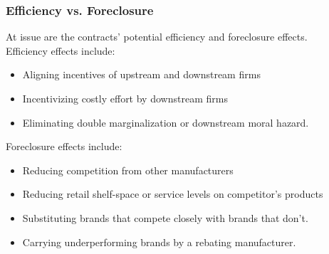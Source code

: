 \begin{frame}
\frametitle{Efficiency vs. Foreclosure}
\small
At issue are the contracts' potential efficiency and foreclosure effects.\\
\vfill
Efficiency effects include:
\begin{itemize}\small
\item Aligning incentives of upstream and downstream firms
\item Incentivizing costly effort by downstream firms
\item Eliminating double marginalization or downstream moral hazard.
\end{itemize} 
Foreclosure effects include:
\begin{itemize}\small
\item Reducing competition from other manufacturers
\item Reducing retail shelf-space or service levels on competitor's products
\item Substituting brands that compete closely with brands that don't.
\item Carrying underperforming brands by a rebating manufacturer.
\end{itemize} 
\end{frame}


